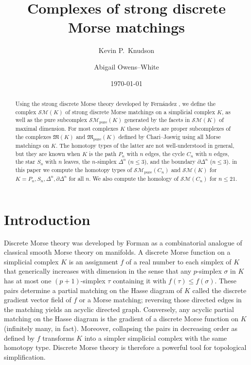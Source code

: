 \documentclass{amsart}
\title{Complexes of strong discrete Morse matchings}
\author{Kevin P.~Knudson}
\author{Abigail Owens--White}
\date{\today}
\theoremstyle{definition}
\newcommand{\sm}{{\mathcal{SM}}}
\newcommand{\smpure}{{\mathcal{SM}}_{\textrm{pure}}}
\begin{document}
\begin{abstract}
Using the strong discrete Morse theory developed by Fern\'andez \cite{Fernandez2026}, we define the complex $\sm(K)$ of strong discrete Morse matchings on a simplicial complex $K$, as well as the pure subcomplex $\smpure(K)$ generated by the facets in $\sm(K)$ of maximal dimension. For most complexes $K$ these objects are proper subcomplexes of the complexes ${\mathfrak M}(K)$ and ${\mathfrak M}_{\textrm{pure}}(K)$ defined by Chari--Joswig \cite{ChariJoswig2005} using all Morse matchings on $K$. The homotopy types of the latter are not well-understood in general, but they are known when $K$ is the path $P_n$ with $n$ edges, the cycle $C_n$ with $n$ edges, the star $S_n$ with $n$ leaves, the $n$-simplex $\Delta^n$ ($n\le 3$), and the boundary $\partial\Delta^n$ ($n\le 3$). in this paper we compute the homotopy types of $\smpure(C_n)$ and $\sm(K)$ for $K=P_n,S_n,\Delta^n,\partial\Delta^n$ for all $n$. We also compute the homology of $\sm(C_n)$ for $n\le 21$.
\end{abstract}

\maketitle

\section{Introduction}  

Discrete Morse theory was developed by Forman \cite{Forman1998} as a combinatorial analogue of classical smooth Morse theory on manifolds. A discrete Morse function on a simplicial complex $K$ is an assignment $f$ of a real number to each simplex of $K$ that generically increases with dimension in the sense that any $p$-simplex $\sigma$ in $K$ has at most one $(p+1)$-simplex $\tau$ containing it with $f(\tau)\le f(\sigma)$. These pairs determine a partial matching on the Hasse diagram of $K$ called the discrete gradient vector field of $f$ or a Morse matching; reversing those directed edges in the matching yields an acyclic directed graph. Conversely, any acyclic partial matching on the Hasse diagram is the gradient of a discrete Morse function on $K$ (infinitely many, in fact). Moreover, collapsing the pairs in decreasing order as defined by $f$ transforms $K$ into a simpler simplicial complex with the same homotopy type. Discrete Morse theory is therefore a powerful tool for topological simplification.
\end{document}
